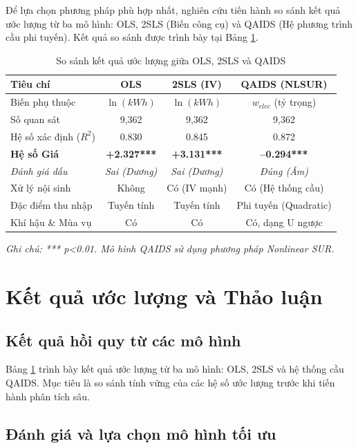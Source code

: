 \documentclass[12pt,a4paper,oneside]{article}
\begin{document}
	Để lựa chọn phương pháp phù hợp nhất, nghiên cứu tiến hành so sánh kết quả ước lượng từ ba mô hình: OLS, 2SLS (Biến công cụ) và QAIDS (Hệ phương trình cầu phi tuyến). Kết quả so sánh được trình bày tại Bảng \ref{tab:model_comparison}.
	
	\begin{table}[H]
		\centering
		\caption{So sánh kết quả ước lượng giữa OLS, 2SLS và QAIDS}
		\label{tab:model_comparison}
		\begin{tabular}{p{4cm} c c c}
			\toprule
			\textbf{Tiêu chí} & \textbf{OLS} & \textbf{2SLS (IV)} & \textbf{QAIDS (NLSUR)} \\
			\midrule
			Biến phụ thuộc & $\ln(kWh)$ & $\ln(kWh)$ & $w_{elec}$ (tỷ trọng) \\
			Số quan sát & 9,362 & 9,362 & 9,362 \\
			Hệ số xác định ($R^2$) & 0.830 & 0.845 & 0.872 \\
			\textbf{Hệ số Giá} & \textbf{+2.327***} & \textbf{+3.131***} & \textbf{–0.294***} \\
			\textit{Đánh giá dấu} & \textit{Sai (Dương)} & \textit{Sai (Dương)} & \textit{Đúng (Âm)} \\
			Xử lý nội sinh & Không & Có (IV mạnh) & Có (Hệ thống cầu) \\
			Đặc điểm thu nhập & Tuyến tính & Tuyến tính & Phi tuyến (Quadratic) \\
			Khí hậu \& Mùa vụ & Có & Có & Có, dạng U ngược \\
			\bottomrule
		\end{tabular}
		\footnotesize{\textit{Ghi chú: *** p<0.01. Mô hình QAIDS sử dụng phương pháp Nonlinear SUR.}}
	\end{table}
	
	
	\section{Kết quả ước lượng và Thảo luận}
	
	\subsection{Kết quả hồi quy từ các mô hình}
	Bảng \ref{tab:model_comparison} trình bày kết quả ước lượng từ ba mô hình: OLS, 2SLS và hệ thống cầu QAIDS. Mục tiêu là so sánh tính vững của các hệ số ước lượng trước khi tiến hành phân tích sâu.
		
	\subsection{Đánh giá và lựa chọn mô hình tối ưu}
	
\end{document}
